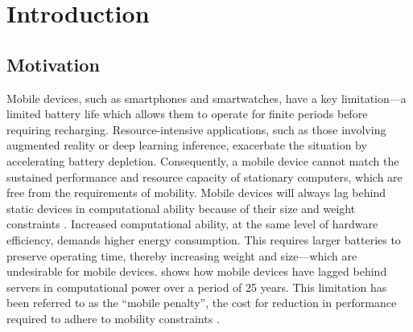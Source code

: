 \chapter{Introduction}
\section{Motivation}
\label{sec:overview}
Mobile devices, such as smartphones and smartwatches, have a key limitation---a
limited battery life which allows them to operate for finite periods before
requiring recharging.  Resource-intensive applications, such as those involving
augmented reality or deep learning inference, exacerbate the situation by
accelerating battery depletion.  Consequently, a mobile device cannot match the
sustained performance and resource capacity of stationary computers, which are
free from the requirements of mobility. Mobile devices will always lag behind
static devices in computational ability because of their size and weight
constraints \cite{satya2014}. Increased computational ability, at the same
level of hardware efficiency, demands higher energy consumption. This requires
larger batteries to preserve operating time, thereby increasing weight and
size---which are undesirable for mobile devices.
 shows how mobile devices have lagged behind
servers in computational power over a period of 25 years. This limitation has
been referred to as the ``mobile penalty'', the cost for reduction in
performance required to adhere to mobility constraints
\cite{satya-edge-native}.

